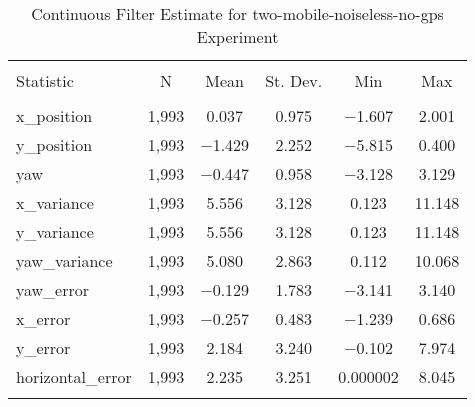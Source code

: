 
\begin{table}[h] \centering 
  \caption{Continuous Filter Estimate for two-mobile-noiseless-no-gps Experiment} 
  \label{tab:two_mobile_noiseless_no_gps_continuous_summary} 
\begin{tabular}{@{\extracolsep{5pt}}lccccc} 
\\[-1.8ex]\hline 
\hline \\[-1.8ex] 
Statistic & \multicolumn{1}{c}{N} & \multicolumn{1}{c}{Mean} & \multicolumn{1}{c}{St. Dev.} & \multicolumn{1}{c}{Min} & \multicolumn{1}{c}{Max} \\ 
\hline \\[-1.8ex] 
x\_position & 1,993 & 0.037 & 0.975 & $-$1.607 & 2.001 \\ 
y\_position & 1,993 & $-$1.429 & 2.252 & $-$5.815 & 0.400 \\ 
yaw & 1,993 & $-$0.447 & 0.958 & $-$3.128 & 3.129 \\ 
x\_variance & 1,993 & 5.556 & 3.128 & 0.123 & 11.148 \\ 
y\_variance & 1,993 & 5.556 & 3.128 & 0.123 & 11.148 \\ 
yaw\_variance & 1,993 & 5.080 & 2.863 & 0.112 & 10.068 \\ 
yaw\_error & 1,993 & $-$0.129 & 1.783 & $-$3.141 & 3.140 \\ 
x\_error & 1,993 & $-$0.257 & 0.483 & $-$1.239 & 0.686 \\ 
y\_error & 1,993 & 2.184 & 3.240 & $-$0.102 & 7.974 \\ 
horizontal\_error & 1,993 & 2.235 & 3.251 & 0.000002 & 8.045 \\ 
\hline \\[-1.8ex] 
\end{tabular} 
\end{table} 
